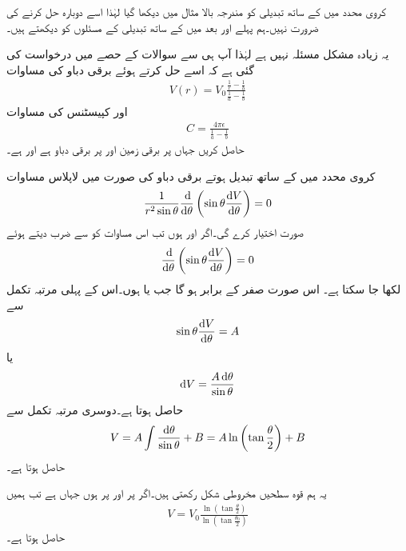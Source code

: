 کروی محدد میں  کے ساتھ تبدیلی کو مندرجہ بالا مثال میں دیکھا گیا لہٰذا اسے دوبارہ حل کرنے کی ضرورت نہیں۔ہم پہلے  اور بعد میں  کے ساتھ تبدیلی کے مسئلوں کو دیکھتے ہیں۔

یہ زیادہ مشکل مسئلہ نہیں ہے لہٰذا آپ ہی سے سوالات کے حصے میں درخواست کی گئی ہے کہ اسے حل کرتے ہوئے برقی دباو کی مساوات 
\begin{align}\label{مساوات_لاپلاس_کروی_رداسی_لاپلاسی_دباو}
V(r)=V_0 \frac{\frac{1}{r}-\frac{1}{b}}{\frac{1}{a}-\frac{1}{b}}
\end{align}
اور کپیسٹنس کی مساوات 
\begin{align}\label{مساوات_لاپلاس_کروی_رداسی_لاپلاسی_کپیسٹنس}
C=\frac{4\pi \epsilon}{\frac{1}{a}-\frac{1}{b}}
\end{align}
حاصل کریں  جہاں  پر برقی زمین اور  پر  برقی دباو ہے اور  ہے۔

کروی محدد میں  کے ساتھ تبدیل ہوتے برقی دباو کی صورت میں لاپلاس مساوات
\begin{align}
\frac{1}{r^2 \sin \theta} \frac{\dif}{\dif \theta}\left(\sin \theta \frac{\dif V}{\dif \theta}\right)=0
\end{align}
صورت اختیار کرے گی۔اگر  اور  ہوں تب اس مساوات کو  سے ضرب دیتے ہوئے
\begin{align}
\frac{\dif}{\dif \theta}\left(\sin \theta \frac{\dif V}{\dif \theta}\right)=0
\end{align}
لکھا جا سکتا ہے۔ اس صورت صفر کے برابر ہو گا جب  یا  ہوں۔اس کے پہلی مرتبہ تکمل سے
\begin{align*}
\sin \theta \frac{\dif V}{\dif \theta}=A
\end{align*}
یا
\begin{align*}
\dif V=\frac{A \dif \theta}{\sin \theta}
\end{align*}
حاصل ہوتا ہے۔دوسری مرتبہ تکمل سے
\begin{align}\label{مساوات_لاپلاس_مخروطی_حل}
V=A\int \frac{\dif \theta}{\sin \theta}+B=A \ln \left(\tan \frac{\theta}{2}\right)+B
\end{align}
حاصل ہوتا ہے۔

یہ ہم قوہ سطحیں مخروطی شکل رکھتی ہیں۔اگر  پر  اور  پر  ہوں جہاں  ہے تب ہمیں
\begin{align}\label{مساوات_لاپلاس_مخروطی_حل_ب}
V=V_0 \frac{\ln \left(\tan \frac{\theta}{2} \right)}{\ln \left(\tan \frac{\theta_0}{2} \right)}
\end{align}
حاصل ہوتا ہے۔

